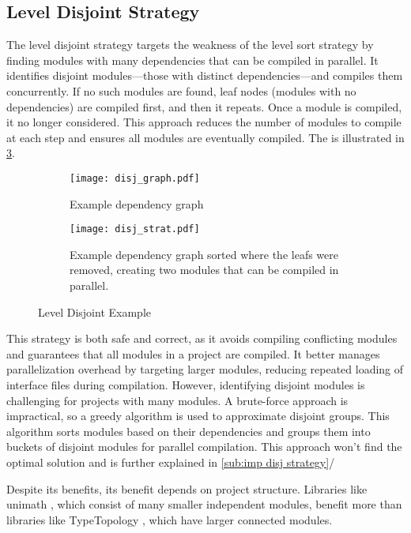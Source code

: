 \pagebreak
\subsection{Level Disjoint Strategy} \label{sub:design disjoint strategy}


The level disjoint strategy targets the weakness of the level sort strategy by
finding modules with many dependencies that can be compiled in parallel. It
identifies disjoint modules—those with distinct dependencies—and compiles them
concurrently. If no such modules are found, leaf nodes (modules with no
dependencies) are compiled first, and then it repeats. Once a module is
compiled, it no longer considered. This approach reduces the number of modules
to compile at each step and ensures all modules are eventually compiled. The
is illustrated in \cref{subfig:disj strat}.
\begin{figure}[H]
  \begin{subfigure}[t]{0.5\textwidth}
    \centering
    \texttt{[image: disj\_graph.pdf]}
    \caption{Example dependency graph}
    \label{fig:example disj dep graph}
  \end{subfigure} \hfill
  \begin{subfigure}[t]{0.40\textwidth}
    \centering
    \texttt{[image: disj\_strat.pdf]}
    \caption{Example dependency graph sorted where the leafs were removed,
    creating two modules that can be compiled in parallel. }
    \label{fig:example disj strat}
  \end{subfigure}
  \caption{Level Disjoint Example}
  \label{subfig:disj strat}
\end{figure}

This strategy is both safe and correct, as it avoids compiling conflicting
modules and guarantees that all modules in a project are compiled. It better
manages parallelization overhead by targeting larger modules, reducing repeated
loading of interface files during compilation. However, identifying disjoint
modules is challenging for projects with many modules. A brute-force approach
is impractical, so a greedy algorithm is used to approximate disjoint groups.
This algorithm sorts modules based on their dependencies and groups them into
buckets of disjoint modules for parallel compilation. This approach won't find
the optimal solution and is further explained in \cref{sub:imp disj strategy}/

Despite its benefits, its benefit depends on project structure. Libraries like
unimath \cite{agda-unimath}, which consist of many smaller independent modules,
benefit more than libraries like TypeTopology \cite{type-topology}, which have
larger connected modules. 

